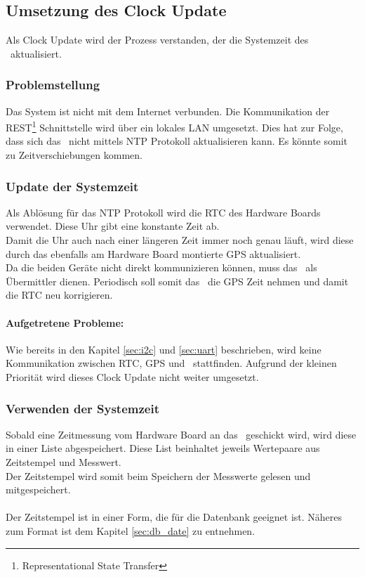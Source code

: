 \subsection{Umsetzung des Clock Update}
Als Clock Update wird der Prozess verstanden, der die Systemzeit des \rpi\ aktualisiert.

\subsubsection{Problemstellung}
Das System ist nicht mit dem Internet verbunden. Die Kommunikation der REST\footnote{Representational State Transfer} Schnittstelle wird über ein lokales LAN umgesetzt. Dies hat zur Folge, dass sich das \rpi\ nicht mittels NTP Protokoll aktualisieren kann. Es könnte somit zu Zeitverschiebungen kommen.

\subsubsection{Update der Systemzeit}
Als Ablösung für das NTP Protokoll wird die RTC des Hardware Boards verwendet. Diese Uhr gibt eine konstante Zeit ab.\\
Damit die Uhr auch nach einer längeren Zeit immer noch genau läuft, wird diese durch das ebenfalls am Hardware Board montierte GPS aktualisiert.\\
Da die beiden Geräte nicht direkt kommunizieren können, muss das \rpi\ als Übermittler dienen. Periodisch soll somit das \rpi\ die GPS Zeit nehmen und damit die RTC neu korrigieren.
\paragraph{Aufgetretene Probleme:} Wie bereits in den Kapitel \ref{sec:i2c} und \ref{sec:uart} beschrieben, wird keine Kommunikation zwischen RTC, GPS und \rpi\ stattfinden. Aufgrund der kleinen Priorität wird dieses Clock Update nicht weiter umgesetzt.

\subsubsection{Verwenden der Systemzeit}
Sobald eine Zeitmessung vom Hardware Board an das \rpi\ geschickt wird, wird diese in einer Liste abgespeichert. Diese List beinhaltet jeweils Wertepaare aus Zeitstempel und Messwert.\\
Der Zeitstempel wird somit beim Speichern der Messwerte gelesen und mitgespeichert.\\
\\
Der Zeitstempel ist in einer Form, die für die Datenbank geeignet ist. Näheres zum Format ist dem Kapitel \ref{sec:db_date} zu entnehmen.